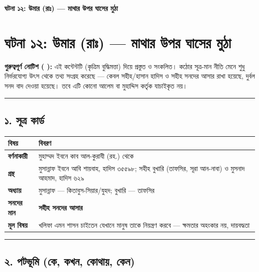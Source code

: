 

\begin{center}{\Large\bfseries\color{emerald} ঘটনা ১২: উমার (রাঃ) — মাথার উপর ঘাসের মুঠা}\end{center}
\vspace{1em}
\section*{ঘটনা ১২: উমার (রাঃ) — মাথার উপর ঘাসের মুঠা}

\begin{warnbox}
 \textbf{গুরুত্বপূর্ণ নোটিশ ( ):} এই কন্টেন্টটি  (কৃত্রিম বুদ্ধিমত্তা) দিয়ে প্রস্তুত ও সংকলিত।  কঠোর সূত্র-মান নীতি মেনে শুধু নির্ভরযোগ্য উৎস থেকে তথ্য সংগ্রহ করেছে — কেবল সহীহ/হাসান হাদিস ও সহীহ সনদের আসার রাখা হয়েছে, দুর্বল সনদ বাদ দেওয়া হয়েছে। তবে এটি কোনো আলেম বা মুহাদ্দিস কর্তৃক যাচাইকৃত নয়।
\end{warnbox}


\medskip\hrule\medskip

\subsection*{১. সূত্র কার্ড}

\begin{table}[h]\centering\small
\begin{tabular}{ll}
বিষয় & বিবরণ \\
\hline
\textbf{বর্ণনাকারী} & মুহাম্মদ ইবনে কাব আল-কুরাযী (রহ.) থেকে \\
\textbf{গ্রন্থ} & মুসান্নাফ ইবনে আবি শায়বাহ, হাদিস ৩৫৫৯৮; সহীহ বুখারি (তাফসির, সূরা আন-নাবা) ও মুসনাদ আহমাদ, হাদিস ৬২৯ \\
\textbf{অধ্যায়} & মুসান্নাফ — কিতাবুস-সিয়ার/যুহদ; বুখারি — তাফসির \\
\textbf{সনদের মান} & \textbf{সহীহ সনদের আসার} \\
\textbf{মূল বিষয়} & খলিফা এমন শাসন চাইতেন যেখানে মানুষ তাকে নিয়ন্ত্রণ করবে — ক্ষমতার অহংকার নয়, দায়বদ্ধতা \\
\hline
\end{tabular}
\end{table}

\medskip\hrule\medskip

\subsection*{২. পটভূমি (কে, কখন, কোথায়, কেন)}

